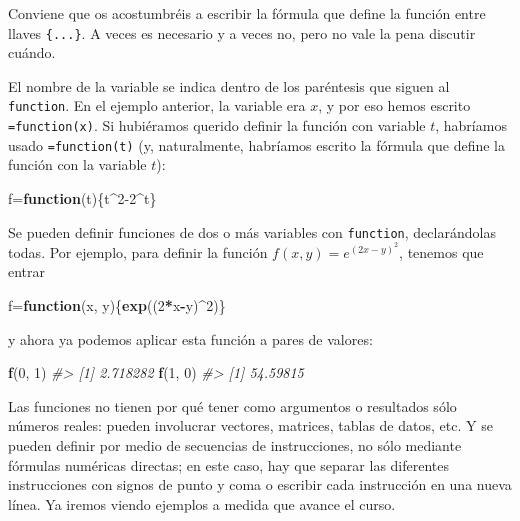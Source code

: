 \documentclass[
]{book}
\newenvironment{Shaded}{\begin{snugshade}}{\end{snugshade}}
\newcommand{\CommentTok}[1]{\textcolor[rgb]{0.56,0.35,0.01}{\textit{#1}}}
\newcommand{\ControlFlowTok}[1]{\textcolor[rgb]{0.13,0.29,0.53}{\textbf{#1}}}
\newcommand{\DecValTok}[1]{\textcolor[rgb]{0.00,0.00,0.81}{#1}}
\newcommand{\KeywordTok}[1]{\textcolor[rgb]{0.13,0.29,0.53}{\textbf{#1}}}
\newcommand{\NormalTok}[1]{#1}
\newcommand{\OperatorTok}[1]{\textcolor[rgb]{0.81,0.36,0.00}{\textbf{#1}}}
\theoremstyle{definition}
\theoremstyle{definition}
\theoremstyle{definition}
\theoremstyle{remark}
\begin{document}
Conviene que os acostumbréis a escribir la fórmula que define la función entre llaves \texttt{\{...\}}. A veces es necesario y a veces no, pero no vale la pena discutir cuándo.

El nombre de la variable se indica dentro de los paréntesis que siguen al \texttt{function}. En el ejemplo anterior, la variable era \(x\), y por eso hemos escrito \texttt{=function(x)}. Si hubiéramos querido definir la función con variable \(t\), habríamos usado \texttt{=function(t)} (y, naturalmente, habríamos escrito la fórmula que define la función con la variable \(t\)):

\begin{Shaded}
\begin{Highlighting}[]
\NormalTok{f=}\ControlFlowTok{function}\NormalTok{(t)\{t}\OperatorTok{\^{}}\DecValTok{2{-}2}\OperatorTok{\^{}}\NormalTok{t\}}
\end{Highlighting}
\end{Shaded}

Se pueden definir funciones de dos o más variables con \texttt{function}, declarándolas todas. Por ejemplo, para definir la función \(f(x,y)=e^{(2x-y)^2}\), tenemos que entrar

\begin{Shaded}
\begin{Highlighting}[]
\NormalTok{f=}\ControlFlowTok{function}\NormalTok{(x, y)\{}\KeywordTok{exp}\NormalTok{((}\DecValTok{2}\OperatorTok{*}\NormalTok{x}\OperatorTok{{-}}\NormalTok{y)}\OperatorTok{\^{}}\DecValTok{2}\NormalTok{)\}}
\end{Highlighting}
\end{Shaded}

y ahora ya podemos aplicar esta función a pares de valores:

\begin{Shaded}
\begin{Highlighting}[]
\KeywordTok{f}\NormalTok{(}\DecValTok{0}\NormalTok{, }\DecValTok{1}\NormalTok{)}
\CommentTok{\#\textgreater{} [1] 2.718282}
\KeywordTok{f}\NormalTok{(}\DecValTok{1}\NormalTok{, }\DecValTok{0}\NormalTok{)}
\CommentTok{\#\textgreater{} [1] 54.59815}
\end{Highlighting}
\end{Shaded}

Las funciones no tienen por qué tener como argumentos o resultados sólo números reales: pueden involucrar vectores, matrices, tablas de datos, etc.
Y se pueden definir por medio de secuencias de instrucciones, no sólo mediante fórmulas numéricas directas; en este caso,
hay que separar las diferentes instrucciones con signos de punto y coma o escribir cada instrucción en una nueva línea.
Ya iremos viendo ejemplos a medida que avance el curso.
\end{document}

